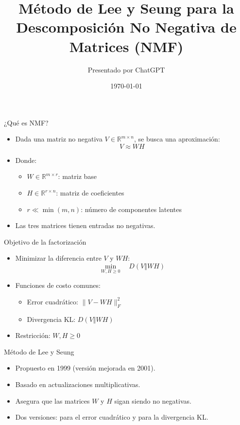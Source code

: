 \documentclass{beamer}
\title{Método de Lee y Seung para la Descomposición No Negativa de Matrices (NMF)}
\author{Presentado por ChatGPT}
\date{\today}
\begin{document}
\frame{\titlepage}


\begin{frame}{¿Qué es NMF?}
\begin{itemize}
    \item Dada una matriz no negativa \( V \in \mathbb{R}^{m \times n} \), se busca una aproximación:
    \[
    V \approx WH
    \]
    \item Donde:
    \begin{itemize}
        \item \( W \in \mathbb{R}^{m \times r} \): matriz base
        \item \( H \in \mathbb{R}^{r \times n} \): matriz de coeficientes
        \item \( r \ll \min(m, n) \): número de componentes latentes
    \end{itemize}
    \item Las tres matrices tienen entradas no negativas.
\end{itemize}
\end{frame}

\begin{frame}{Objetivo de la factorización}
\begin{itemize}
    \item Minimizar la diferencia entre \( V \) y \( WH \):
    \[
    \min_{W, H \geq 0} \quad D(V \Vert WH)
    \]
    \item Funciones de costo comunes:
    \begin{itemize}
        \item Error cuadrático: \( \| V - WH \|_F^2 \)
        \item Divergencia KL: \( D(V \Vert WH) \)
    \end{itemize}
    \item Restricción: \( W, H \geq 0 \)
\end{itemize}
\end{frame}

\begin{frame}{Método de Lee y Seung}
\begin{itemize}
    \item Propuesto en 1999 (versión mejorada en 2001).
    \item Basado en actualizaciones multiplicativas.
    \item Asegura que las matrices \( W \) y \( H \) sigan siendo no negativas.
    \item Dos versiones: para el error cuadrático y para la divergencia KL.
\end{itemize}
\end{frame}
\end{document}
